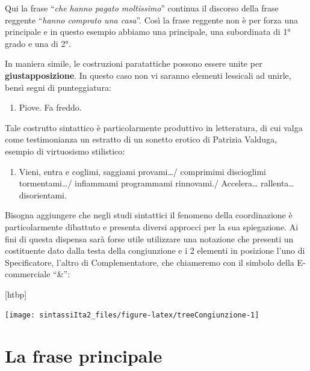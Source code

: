 \documentclass[
  a4paper,
  twoside,
  11pt,
  chapterprefix=false,
  bibliography=totocnumbered,
  listof=flat]{scrbook}
\makeatletter
\providecommand{\tightlist}{%
  \setlength{\itemsep}{0pt}\setlength{\parskip}{0pt}}
\def\fps@figure{htbp}
\renewenvironment{figure}[1][\fps@figure]{
  \edef\@tempa{\noexpand\@float{figure}[#1]} 
  \@tempa
  \sffamily
}{
  \end@float
}
\makeatother
\begin{document}
Qui la frase \enquote{\emph{che hanno pagato moltissimo}} continua il discorso della frase reggente \enquote{\emph{hanno comprato una casa}}.
Così la frase reggente non è per forza una principale e in questo esempio abbiamo una principale, una subordinata di 1° grado e una di 2°.

In maniera simile, le costruzioni paratattiche possono essere unite per \textbf{giustapposizione}. In questo caso non vi saranno elementi lessicali ad unirle, bensì segni di punteggiatura:

\begin{enumerate}
\def\labelenumi{(\arabic{enumi})}
\setcounter{enumi}{21}
\tightlist
\item
  Piove. Fa freddo.
\end{enumerate}

Tale costrutto sintattico è particolarmente produttivo in letteratura, di cui valga come testimonianza un estratto di un sonetto erotico di Patrizia Valduga, esempio di virtuosismo stilistico:

\begin{enumerate}
\def\labelenumi{(\arabic{enumi})}
\setcounter{enumi}{22}
\tightlist
\item
  Vieni, entra e coglimi, saggiami provami\ldots{}/ comprimimi discioglimi tormentami\ldots{}/ infiammami programmami rinnovami./ Accelera\ldots{} rallenta\ldots{} disorientami. \citep{valduga1982}
\end{enumerate}

Bisogna aggiungere che negli studi sintattici il fenomeno della coordinazione è particolarmente dibattuto e presenta diversi approcci per la sua spiegazione. Ai fini di questa dispensa sarà forse utile utilizzare una notazione che presenti un costituente dato dalla testa della congiunzione e i 2 elementi in posizione l'uno di Specificatore, l'altro di Complementatore, che chiameremo con il simbolo della E-commerciale \enquote{\&}:

\begin{figure}

{\centering \texttt{[image: sintassiIta2\_files/figure-latex/treeCongiunzione-1]} 

}

\caption{Il costituente di congiunzione}\label{fig:treeCongiunzione}
\end{figure}

\hypertarget{la-frase-principale}{%
\section{La frase principale}\label{la-frase-principale}}
\end{document}

